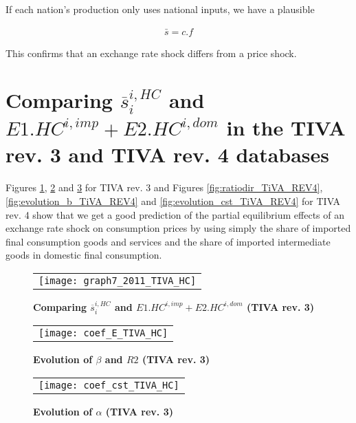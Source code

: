 \documentclass[11pt,a4paper]{article}
\begin{document}
If each nation's production only uses national inputs, we have a plausible

\begin{gather*}
\bar{s}=c.f
\end{gather*}

This confirms that an exchange rate shock differs from a price shock.

\newpage
\section{Comparing $\overline{s}_{i}^{i,HC}$ and $E1.HC^{i,imp}+E2.HC^{i,dom}$ in the TIVA rev. 3 and TIVA rev. 4 databases} \label{AppendixFonctionLinéaireTIVA}

Figures \ref{fig:ratiodir_TiVA}, \ref{fig:evolution_b_TiVA} and \ref{fig:evolution_cst_TiVA} for TIVA rev. 3 and Figures \ref{fig:ratiodir_TiVA_REV4}, \ref{fig:evolution_b_TiVA_REV4} and \ref{fig:evolution_cst_TiVA_REV4} for TIVA rev. 4 show that we get a good prediction of the partial equilibrium effects of an exchange rate shock on consumption prices by using simply the share of imported final consumption goods and services and the share of imported intermediate goods in domestic final consumption.




\begin{figure}[!h]
	\centering
	\caption{\footnotesize{\textbf{Comparing $\overline{s}_{i}^{i,HC}$ and $E1.HC^{i,imp}+E2.HC^{i,dom}$ (TIVA rev. 3)}}}
	\begin{tabular}{c}
		\texttt{[image: graph7\_2011\_TIVA\_HC]}\\
	\end{tabular}
	\label{fig:ratiodir_TiVA}
\end{figure}

\begin{figure}[!h]
	\centering
	\caption{\footnotesize{\textbf{Evolution of $\beta$ and $R2$ (TIVA rev. 3)}}}
	\begin{tabular}{c}
		\texttt{[image: coef\_E\_TIVA\_HC]}\\
	\end{tabular}
	\label{fig:evolution_b_TiVA}
\end{figure}

\begin{figure}[!h]
	\centering
	\caption{\footnotesize{\textbf{Evolution of $\alpha$ (TIVA rev. 3)}}}
	\begin{tabular}{c}
		\texttt{[image: coef\_cst\_TIVA\_HC]}\\
	\end{tabular}
	\label{fig:evolution_cst_TiVA}
\end{figure}
\end{document}
